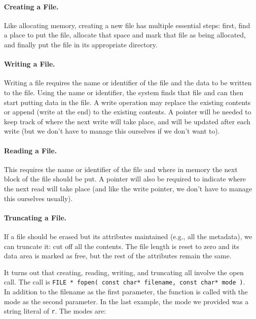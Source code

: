 \paragraph{Creating a File.} Like allocating memory, creating a new file has multiple essential steps: first, find a place to put the file, allocate that space and mark that file as being allocated, and finally put the file in its appropriate directory.

\paragraph{Writing a File.} Writing a file requires the name or identifier of the file and the data to be written to the file. Using the name or identifier, the system finds that file and can then start putting data in the file. A write operation may replace the existing contents or append (write at the end) to the existing contents. A pointer will be needed to keep track of where the next write will take place, and will be updated after each write (but we don't have to manage this ourselves if we don't want to).

\paragraph{Reading a File.} This requires the name or identifier of the file and where in memory the next block of the file should be put. A pointer will also be required to indicate where the next read will take place (and like the write pointer, we don't have to manage this ourselves usually).

\paragraph{Truncating a File.} If a file should be erased but its attributes maintained (e.g., all the metadata), we can truncate it: cut off all the contents. The file length is reset to zero and its data area is marked as free, but the rest of the attributes remain the same.


It turns out that creating, reading, writing, and truncating all involve the open call. The call is \texttt{FILE * fopen( const char* filename, const char* mode )}. In addition to the filename as the first parameter, the function is called with the mode as the second parameter. In the last example, the mode we provided was a string literal of \texttt{r}. The modes are:

